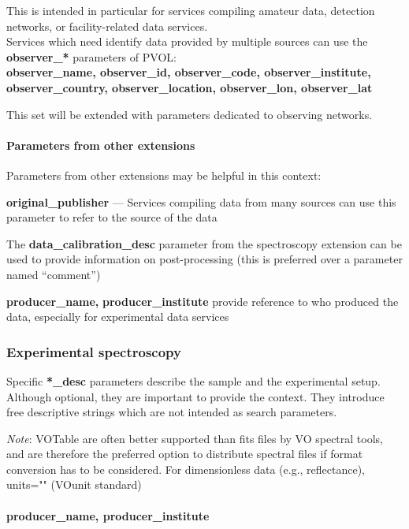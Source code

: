 \documentclass[11pt,a4paper]{ivoa}
\begin{document}
This is intended in particular for services compiling amateur data,
detection networks, or facility-related data services.\\
Services which need identify data
provided by multiple sources can use the
\textbf{observer\_* }parameters of PVOL: \\
\textbf{observer\_name, observer\_id, observer\_code,
observer\_institute, observer\_country,
observer\_location, observer\_lon, observer\_lat}

This set will be extended with parameters dedicated to observing networks.

\paragraph{Parameters from other extensions}

Parameters from other extensions may be helpful in this context:

\textbf{original\_publisher} --- Services compiling data from many sources
can use this\textbf{ }parameter to refer to the source of the data

The\textbf{ \textbf{data\_calibration\_desc}} parameter from
the spectroscopy extension can be used to provide information on
post-processing (this is preferred over a parameter named ``comment'')

\textbf{producer\_name, }\textbf{producer\_institute }provide reference
to who produced the data, especially for experimental data services

\subsubsection{Experimental spectroscopy}

Specific \textbf{*\_desc} parameters describe the sample and the
experimental setup. Although optional, they are important to provide the
context. They introduce free descriptive strings which are not intended
as search parameters.

\emph{Note}: VOTable are often better supported than fits files by VO
spectral tools, and are therefore the preferred option to distribute
spectral files if format conversion has to be considered. For
dimensionless data (e.g., reflectance), units="" (VOunit standard)

\paragraph{producer\_name, producer\_institute}
\end{document}
